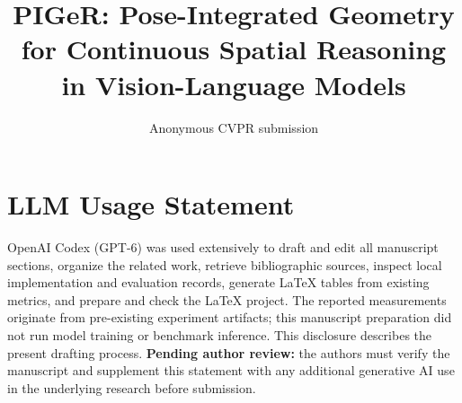\documentclass[10pt,twocolumn,letterpaper]{article}
\title{PIGeR: Pose-Integrated Geometry for Continuous Spatial Reasoning in Vision-Language Models}
\author{Anonymous CVPR submission}
\begin{document}
\maketitle






\section*{LLM Usage Statement}
OpenAI Codex (GPT-6) was used extensively to draft and edit all manuscript sections, organize the related work, retrieve bibliographic sources, inspect local implementation and evaluation records, generate LaTeX tables from existing metrics, and prepare and check the LaTeX project. The reported measurements originate from pre-existing experiment artifacts; this manuscript preparation did not run model training or benchmark inference. This disclosure describes the present drafting process. \textbf{Pending author review:} the authors must verify the manuscript and supplement this statement with any additional generative AI use in the underlying research before submission.
{\small


}
\end{document}

